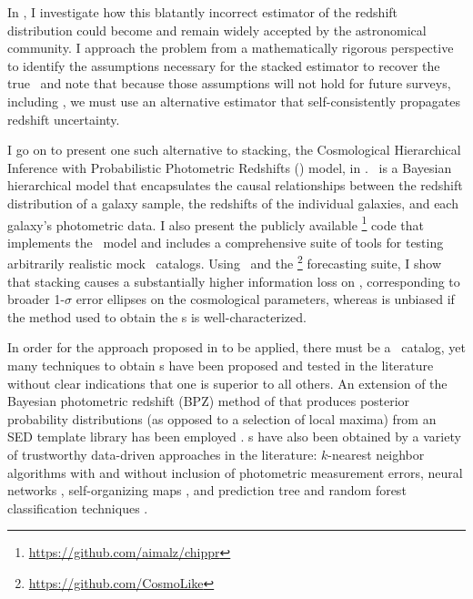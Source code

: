 In , I investigate how this blatantly incorrect estimator of the redshift distribution could become and remain widely accepted by the astronomical community.
I approach the problem from a mathematically rigorous perspective to identify the assumptions necessary for the stacked estimator to recover the true \Nz\ and note that because those assumptions will not hold for future surveys, including \lsst, we must use an alternative estimator that self-consistently propagates redshift uncertainty.

I go on to present one such alternative to stacking, the Cosmological Hierarchical Inference with Probabilistic Photometric Redshifts (\Chippr) model, in .
\Chippr\ is a Bayesian hierarchical model that encapsulates the causal relationships between the redshift distribution of a galaxy sample, the redshifts of the individual galaxies, and each galaxy's photometric data.
I also present the publicly available \chippr\footnote{\url{https://github.com/aimalz/chippr}} code that implements the \Chippr\ model and includes a comprehensive suite of tools for testing arbitrarily realistic mock \pzpdf\ catalogs.
Using \chippr\ and the \cosmolike\footnote{\url{https://github.com/CosmoLike}} forecasting suite, I show that stacking causes a substantially higher information loss on \nz, corresponding to broader 1-$\sigma$ error ellipses on the cosmological parameters, whereas \chippr is unbiased if the method used to obtain the \pzpdf s is well-characterized.

In order for the approach proposed in  to be applied, there must be a \pzpdf\ catalog, yet many techniques to obtain \pzpdf s have been proposed and tested in the literature without clear indications that one is superior to all others.  
An extension of the Bayesian photometric redshift (BPZ) method of \citet{Benitez2000} that produces posterior probability distributions (as opposed to a selection of local maxima) from an SED template library has been employed \citep{Hildebrandt2012, Kelly2014, Lopez-Sanjuan2015}.  
\Pzpdf s have also been obtained by a variety of trustworthy data-driven approaches in the literature: $k$-nearest neighbor algorithms with \citep{Ball2008} and without \citep{sheldon_photometric_2012} inclusion of photometric measurement errors, neural networks \citep{bonnett_using_2015}, self-organizing maps \citep{carrasco_kind_exhausting_2014}, and prediction tree and random forest classification techniques \citep{Carliles2010, carrasco_kind_tpz:_2013}.  

